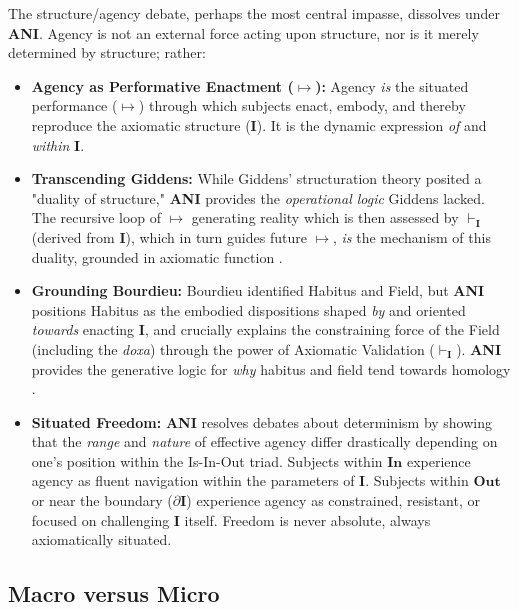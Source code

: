 \documentclass{article}
\newcommand{\ANI}{\textbf{ANI}}             %
\newcommand{\Isness}{\mathbf{I}}            %
\newcommand{\Inness}{\mathbf{In}}           %
\newcommand{\Outness}{\mathbf{Out}}         %
\newcommand{\enactment}{\ensuremath{\mapsto}} %
\newcommand{\validates}[1]{\ensuremath{\vdash_{#1}}} %
\newcommand{\boundary}[1]{\ensuremath{\partial #1}} %
\begin{document}
The structure/agency debate, perhaps the most central impasse, dissolves under \ANI{}. Agency is not an external force acting upon structure, nor is it merely determined by structure; rather:
\begin{itemize}
    \item \textbf{Agency as Performative Enactment ($\enactment$):} Agency \textit{is} the situated performance ($\enactment$) \citep{Goffman1959} through which subjects enact, embody, and thereby reproduce the axiomatic structure ($\Isness$). It is the dynamic expression \textit{of} and \textit{within} $\Isness$.
    \item \textbf{Transcending Giddens:} While Giddens' structuration theory posited a "duality of structure," \ANI{} provides the \textit{operational logic} Giddens lacked. The recursive loop of $\enactment$ generating reality which is then assessed by $\validates{\Isness}$ (derived from $\Isness$), which in turn guides future $\enactment$, \textit{is} the mechanism of this duality, grounded in axiomatic function \citep{Giddens1984}.
    \item \textbf{Grounding Bourdieu:} Bourdieu identified Habitus and Field, but \ANI{} positions Habitus as the embodied dispositions shaped \textit{by} and oriented \textit{towards} enacting $\Isness$, and crucially explains the constraining force of the Field (including the \textit{doxa}) through the power of Axiomatic Validation ($\validates{\Isness}$). \ANI{} provides the generative logic for \textit{why} habitus and field tend towards homology \citep{Bourdieu1977, Bourdieu1990}.
    \item \textbf{Situated Freedom:} \ANI{} resolves debates about determinism by showing that the \textit{range} and \textit{nature} of effective agency differ drastically depending on one's position within the Is-In-Out triad. Subjects within $\Inness$ experience agency as fluent navigation within the parameters of $\Isness$. Subjects within $\Outness$ or near the boundary ($\boundary{\Isness}$) experience agency as constrained, resistant, or focused on challenging $\Isness$ itself. Freedom is never absolute, always axiomatically situated.
\end{itemize}

\subsection{Macro versus Micro}
\end{document}
